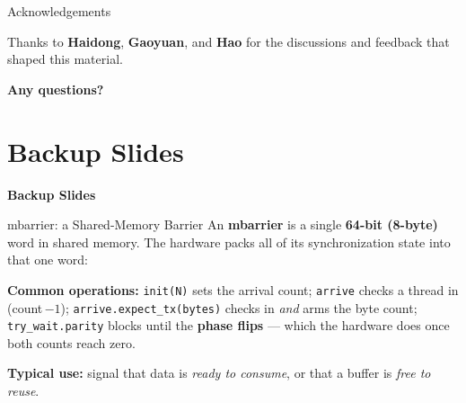 \documentclass[aspectratio=169,professionalfonts]{beamer}
\newcommand{\code}[1]{\texttt{#1}}
\newcommand{\sectionslide}[2]{%
  \begin{frame}[plain]
    \begin{center}
      \vspace{1.8cm}
      \hypertarget{#1}{}%
      {\usebeamercolor[fg]{title}\Large\bfseries #2}
    \end{center}
  \end{frame}%
}
\begin{document}
\begin{frame}{Acknowledgements}
  \vspace{1.4cm}
  \begin{center}
    \large
    Thanks to \textbf{Haidong}, \textbf{Gaoyuan}, and \textbf{Hao} for the
    discussions and feedback that shaped this material.
  \end{center}
\end{frame}

\begin{frame}[plain]
  \begin{center}
    \vspace{2.2cm}
    {\Huge\bfseries Any questions?}
  \end{center}
\end{frame}

\section{Backup Slides}
\sectionslide{toc:backup}{Backup Slides}

\begin{frame}{mbarrier: a Shared-Memory Barrier}
  An \textbf{mbarrier} is a single \textbf{64-bit (8-byte)} word in shared memory.
  The hardware packs all of its synchronization state into that one word:

  \vspace{0.35cm}
  \begin{center}
  \end{center}

  \vspace{0.5cm}
  \small \textbf{Common operations:} \code{init(N)} sets the arrival count;
  \code{arrive} checks a thread in (count\,$-1$); \code{arrive.expect\_tx(bytes)}
  checks in \emph{and} arms the byte count; \code{try\_wait.parity} blocks until
  the \textbf{phase flips} --- which the hardware does once both counts reach zero.

  \vspace{0.15cm}
  \small \textbf{Typical use:} signal that data is \emph{ready to consume}, or
  that a buffer is \emph{free to reuse}.
\end{frame}
\end{document}
